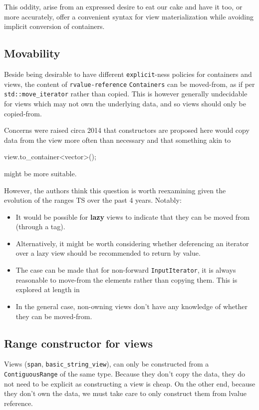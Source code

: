 \documentclass{wg21}
\newcommand{\cc}[1]{\texttt{#1}}
\begin{document}
This oddity, arise from an expressed desire to eat our cake and have it too, or more accurately, offer a convenient syntax for view materialization while avoiding implicit conversion of containers.

\subsection{Movability}

Beside being desirable to have different \cc{explicit}-ness policies for containers and views, the content of \cc{rvalue-reference} \cc{Containers}
can be moved-from, as if per \cc{std::move_iterator} rather than copied.
This is however generally undecidable for views which may not own the underlying data, and so views should only be copied-from.

Concerns were raised circa 2014 that constructors are proposed here would copy data from the view more often than necessary and that something akin to
\begin{codeblock}
view.to_container<vector>();
\end{codeblock}
might be more suitable.

However, the authors think this question is worth reexamining given the evolution of the ranges TS over the past 4 years.
Notably:
\begin{itemize}
	\item It would be possible for \textbf{lazy} views to indicate that they can be moved from (through a tag).
	\item Alternatively, it might be worth considering whether deferencing an iterator over a lazy view should be recommended to return by value.
	\item The case can be made that for non-forward \cc{InputIterator}, it is always reasonable to move-from the elements rather than copying them. This is explored at length in \cite{P1207}
	\item In the general case, non-owning views don't have any knowledge of whether they can be moved-from.
\end{itemize}



\subsection{Range constructor for views}

Views (\cc{span}, \cc{basic_string_view}), can only be constructed from a \cc{ContiguousRange} of the same type.
Because they don't copy the data, they do not need to be explicit as constructing a view is cheap.
On the other end, because they don't own the data, we must take care to only construct them from lvalue reference.
\end{document}
